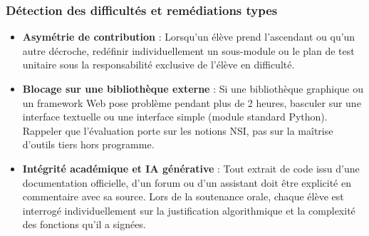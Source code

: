 \subsubsection*{Détection des difficultés et remédiations types}
\begin{itemize}
  \item \textbf{Asymétrie de contribution} : Lorsqu'un élève prend l'ascendant ou qu'un autre décroche, redéfinir individuellement un sous-module ou le plan de test unitaire sous la responsabilité exclusive de l'élève en difficulté.
  \item \textbf{Blocage sur une bibliothèque externe} : Si une bibliothèque graphique ou un framework Web pose problème pendant plus de 2 heures, basculer sur une interface textuelle ou une interface simple (module standard Python). Rappeler que l'évaluation porte sur les notions NSI, pas sur la maîtrise d'outils tiers hors programme.
  \item \textbf{Intégrité académique et IA générative} : Tout extrait de code issu d'une documentation officielle, d'un forum ou d'un assistant doit être explicité en commentaire avec sa source. Lors de la soutenance orale, chaque élève est interrogé individuellement sur la justification algorithmique et la complexité des fonctions qu'il a signées.
\end{itemize}
\fi
